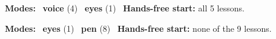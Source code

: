 \expandafter\def\csname hlchaptermodality15\endcsname{%
  {\small\noindent
    \textbf{Modes:} \hlvoicesign{}~\textbf{voice} (4) \quad \hlsightsign{}~\textbf{eyes} (1)\quad
    \hlvoicesign{}~\textbf{Hands-free start:} all 5 lessons.%
    \par}\medskip
}

\expandafter\def\csname hlchaptermodality16\endcsname{%
  {\small\noindent
    \textbf{Modes:} \hlsightsign{}~\textbf{eyes} (1) \quad \hlpensign{}~\textbf{pen} (8)\quad
    \hlvoicesign{}~\textbf{Hands-free start:} none of the 9 lessons.%
    \par}\medskip
}
